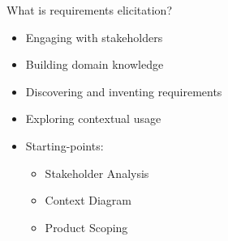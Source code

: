 \begin{Slide}{What is requirements elicitation?}
\begin{itemize}
\item Engaging with stakeholders
\item Building domain knowledge
\item Discovering and inventing requirements
\item Exploring contextual usage
\item Starting-points: 
\begin{itemize}
\item Stakeholder Analysis
\item Context Diagram
\item Product Scoping

\end{itemize}
\end{itemize}
\end{Slide}